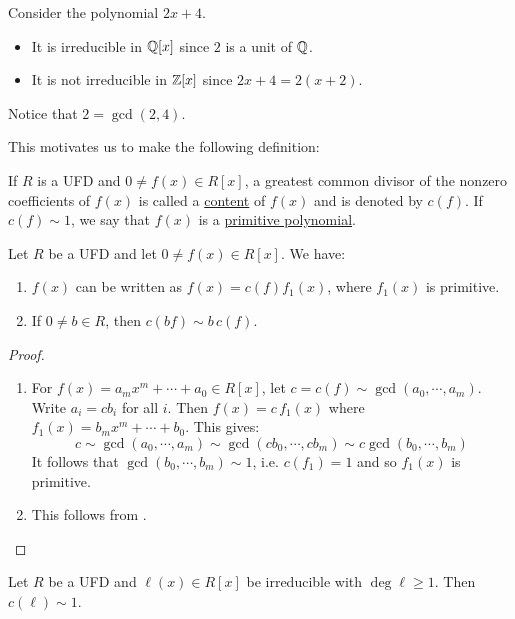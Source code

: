 \documentclass[11pt]{article}
\begin{document}
\begin{example}
    Consider the polynomial $2x+4$.
    \begin{itemize}
        \item It is irreducible in $\mathbb{Q}[x]$ since $2$ is a unit of $\mathbb{Q}$.
        \item It is not irreducible in $\mathbb{Z}[x]$ since $2x+4=2(x+2)$.
    \end{itemize}
    Notice that $2=\gcd(2,4)$.
\end{example}

This motivates us to make the following definition:

\begin{definition}
    If $R$ is a UFD and $0\neq f(x)\in R[x]$, a greatest common divisor of the nonzero coefficients of $f(x)$ is called a \ul{content} of $f(x)$ and is denoted by $c(f)$. If $c(f)\sim 1$, we say that $f(x)$ is a \ul{primitive polynomial}.
\end{definition}

\begin{lemma}
    Let $R$ be a UFD and let $0\neq f(x)\in R[x]$. We have:
    \begin{enumerate}
        \item $f(x)$ can be written as $f(x)=c(f)f_1(x)$, where $f_1(x)$ is primitive.
        \item If $0\neq b\in R$, then $c(bf)\sim b\,c(f)$.
    \end{enumerate}
\end{lemma}

\begin{proof}\,
    \begin{enumerate}
        \item For $f(x)=a_mx^m+\cdots+a_0\in R[x]$, let $c=c(f)\sim\gcd(a_0,\cdots,a_m)$. Write $a_i=cb_i$ for all $i$. Then $f(x)=c\,f_1(x)$ where $f_1(x)=b_mx^m+\cdots+b_0$. This gives:
        \[c\sim\gcd(a_0,\cdots,a_m)\sim\gcd(cb_0,\cdots,cb_m)\sim c\gcd(b_0,\cdots,b_m)\]
        It follows that $\gcd(b_0,\cdots,b_m)\sim 1$, i.e. $c(f_1)=1$ and so $f_1(x)$ is primitive.

        \item This follows from .
    \end{enumerate}
\end{proof}

\begin{lemma}
    Let $R$ be a UFD and $\ell(x)\in R[x]$ be irreducible with $\deg\ell\geq1$. Then $c(\ell)\sim1$.
\end{lemma}
\end{document}
